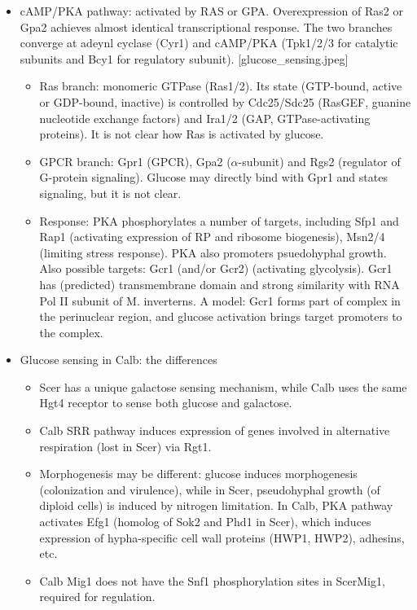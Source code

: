\documentclass{report}
\begin{document}
\begin{itemize}
\item cAMP/PKA pathway: activated by RAS or GPA. Overexpression of Ras2 or Gpa2 achieves almost identical transcriptional response. The two branches converge at adeynl cyclase (Cyr1) and cAMP/PKA (Tpk1/2/3 for catalytic subunits and Bcy1 for regulatory subunit). [glucose\_sensing.jpeg]
\begin{itemize}
	\item Ras branch: monomeric GTPase (Ras1/2). Its state (GTP-bound, active or GDP-bound, inactive) is controlled by Cdc25/Sdc25 (RasGEF, guanine nucleotide exchange factors) and Ira1/2 (GAP, GTPase-activating proteins). It is not clear how Ras is activated by glucose. 
	\item GPCR branch: Gpr1 (GPCR), Gpa2 ($\alpha$-subunit) and Rgs2 (regulator of G-protein signaling). Glucose may directly bind with Gpr1 and states signaling, but it is not clear. 
	\item Response: PKA phosphorylates a number of targets, including Sfp1 and Rap1 (activating expression of RP and ribosome biogenesis), Msn2/4 (limiting stress response). PKA also promoters psuedohyphal growth. Also possible targets: Gcr1 (and/or Gcr2) (activating glycolysis). Gcr1 has (predicted) transmembrane domain and strong similarity with RNA Pol II subunit of M. inverterns. A model: Gcr1 forms part of complex in the perinuclear region, and glucose activation brings target promoters to the complex.
\end{itemize}

\item Glucose sensing in Calb: the differences
\begin{itemize}
	\item Scer has a unique galactose sensing mechanism, while Calb uses the same Hgt4 receptor to sense both glucose and galactose. 
	\item Calb SRR pathway induces expression of genes involved in alternative respiration (lost in Scer) via Rgt1. 
	\item Morphogenesis may be different: glucose induces morphogenesis (colonization and virulence), while in Scer, pseudohyphal growth (of diploid cells) is induced by nitrogen limitation. In Calb, PKA pathway activates Efg1 (homolog of Sok2 and Phd1 in Scer), which induces expression of hypha-specific cell wall proteins (HWP1, HWP2), adhesins, etc. 
	\item Calb Mig1 does not have the Snf1 phosphorylation sites in ScerMig1, required for regulation. 
\end{itemize}


\end{itemize}
\end{document}
